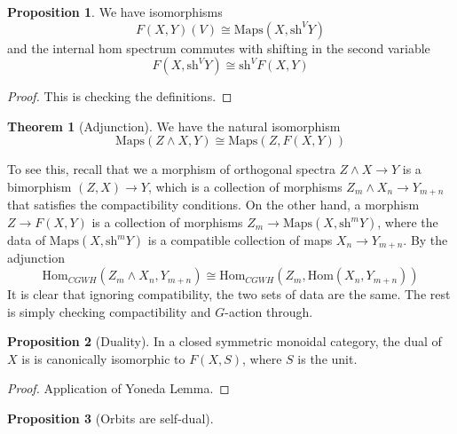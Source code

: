 \documentclass{article}
\theoremstyle{definition}
\newtheorem{theorem}{Theorem}[section]
\theoremstyle{definition}
\theoremstyle{definition}
\theoremstyle{definition}
\newtheorem{proposition}{Proposition}[theorem]
\theoremstyle{definition}
\theoremstyle{definition}
\theoremstyle{definition}
\begin{document}
\begin{tcolorbox}[colback=blue!5!white,colframe=blue!30!white]
\begin{proposition}
We have isomorphisms 
\[F(X,Y)(V)\cong \textrm{Maps}(X, \textrm{sh}^VY)\]
and the internal hom spectrum commutes with shifting in the second variable
\[F(X,\textrm{sh}^VY)\cong \textrm{sh}^VF(X,Y)\]
\end{proposition}
\end{tcolorbox}
\begin{proof}
    This is checking the definitions.
\end{proof}


\begin{tcolorbox}[colback=red!5!white,colframe=red!30!white]
\begin{theorem}[Adjunction]
We have the natural isomorphism
\[\textrm{Maps}(Z\wedge X,Y)\cong \textrm{Maps}(Z, F(X,Y))\]
\end{theorem}
\end{tcolorbox}
To see this, recall that we a morphism of orthogonal spectra $Z\wedge X\to Y$ is a bimorphism $(Z,X)\to Y$, which is a collection of morphisms $Z_m\wedge X_n\to Y_{m+n}$ that satisfies the compactibility conditions. On the other hand, a morphism $Z\to F(X,Y)$ is a collection of morphisms $Z_m\to \textrm{Maps}(X,\textrm{sh}^mY)$, where the data of $\textrm{Maps}(X,\textrm{sh}^mY)$ is a compatible collection of maps $X_n\to Y_{m+n}$. By the adjunction $$\textrm{Hom}_{CGWH}(Z_m\wedge X_n,Y_{m+n})\cong \textrm{Hom}_{CGWH}(Z_m, \textrm{Hom}(X_n,Y_{m+n}))$$
It is clear that ignoring compatibility, the two sets of data are the same. The rest is simply checking compactibility and $G$-action through. 



\begin{tcolorbox}[colback=blue!5!white,colframe=blue!30!white]
\begin{proposition}[Duality]
In a closed symmetric monoidal category, the dual of $X$ is is canonically isomorphic to $F(X,S)$, where $S$ is the unit. 
\end{proposition}
\end{tcolorbox}
\begin{proof}
    Application of Yoneda Lemma.
\end{proof}


\begin{tcolorbox}[colback=blue!5!white,colframe=blue!30!white]
\begin{proposition}[Orbits are self-dual]

\end{proposition}
\end{tcolorbox}
\end{document}
